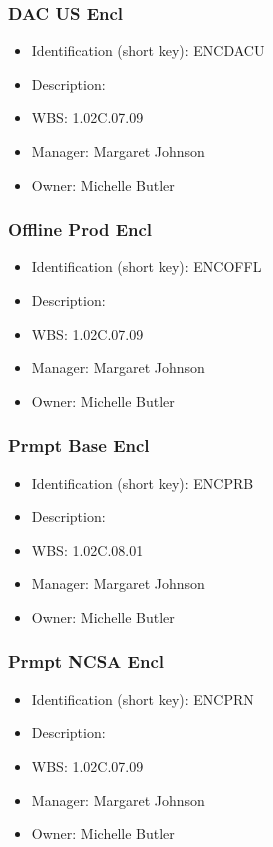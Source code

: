 \subsubsection{DAC US Encl}\label{sect:ENCDACU}
\begin{itemize}
\item Identification (short key): ENCDACU
\item Description: 
\item WBS: 1.02C.07.09
\item Manager: Margaret Johnson
\item Owner: Michelle Butler
\end{itemize}

\subsubsection{Offline Prod Encl}\label{sect:ENCOFFL}
\begin{itemize}
\item Identification (short key): ENCOFFL
\item Description: 
\item WBS: 1.02C.07.09
\item Manager: Margaret Johnson
\item Owner: Michelle Butler
\end{itemize}

\subsubsection{Prmpt Base Encl}\label{sect:ENCPRB}
\begin{itemize}
\item Identification (short key): ENCPRB
\item Description: 
\item WBS: 1.02C.08.01
\item Manager: Margaret Johnson
\item Owner: Michelle Butler
\end{itemize}

\subsubsection{Prmpt NCSA Encl}\label{sect:ENCPRN}
\begin{itemize}
\item Identification (short key): ENCPRN
\item Description: 
\item WBS: 1.02C.07.09
\item Manager: Margaret Johnson
\item Owner: Michelle Butler
\end{itemize}

